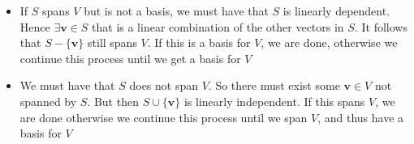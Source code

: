 \documentclass{report}
\begin{document}
\begin{myproof}
    \begin{itemize}
        \item If $S$ spans  $V$ but is not a basis, we must have that  $S$ is linearly dependent. Hence  $\exists \mathbf{v}\in S$ that is a linear combination of the other vectors in $S$. It follows that  $S-\{\mathbf{v}\}$ still spans $V$. If this is a basis for  $V$, we are done, otherwise we continue this process until we get a basis for  $V$
        \item We must have that  $S$ does not span $V$. So there must exist some  $\mathbf{v} \in V$ not spanned by $S$. But then  $S \cup  \{\mathbf{v}\}$ is linearly independent. If this spans $V$, we are done otherwise we continue this process until we span  $V$, and thus have a basis for  $V$

    \end{itemize}
\end{myproof}
\end{document}
